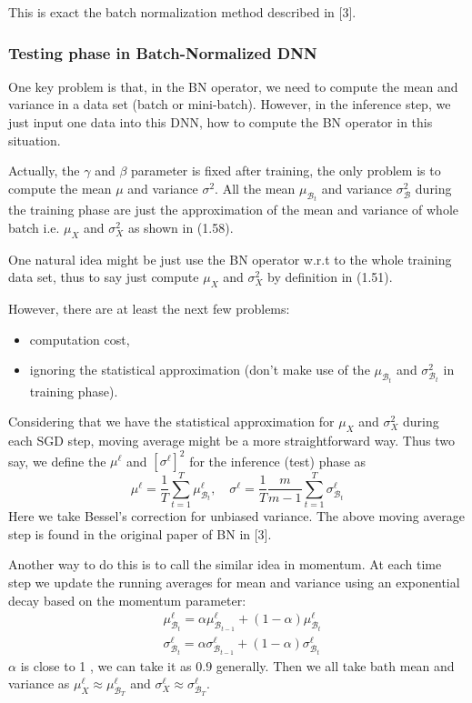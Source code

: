 \documentclass[10pt]{article}
\begin{document}
This is exact the batch normalization method described in [3].

\subsubsection{Testing phase in Batch-Normalized DNN}
One key problem is that, in the BN operator, we need to compute the mean and variance in a data set (batch or mini-batch). However, in the inference step, we just input one data into this DNN, how to compute the BN operator in this situation.

Actually, the $\gamma$ and $\beta$ parameter is fixed after training, the only problem is to compute the mean $\mu$ and variance $\sigma^{2}$. All the mean $\mu_{\mathcal{B}_{t}}$ and variance $\sigma_{\mathcal{B}}^{2}$ during the training phase are just the approximation of the mean and variance of whole batch i.e. $\mu_{X}$ and $\sigma_{X}^{2}$ as shown in (1.58).

One natural idea might be just use the BN operator w.r.t to the whole training data set, thus to say just compute $\mu_{X}$ and $\sigma_{X}^{2}$ by definition in (1.51).

However, there are at least the next few problems:

    \begin{itemize}
      \item computation cost,

      \item ignoring the statistical approximation (don't make use of the $\mu_{\mathcal{B}_{t}}$ and $\sigma_{\mathcal{B}_{t}}^{2}$ in training phase).

    \end{itemize}
Considering that we have the statistical approximation for $\mu_{X}$ and $\sigma_{X}^{2}$ during each SGD step, moving average might be a more straightforward way. Thus two say, we define the $\mu^{\ell}$ and $\left[\sigma^{\ell}\right]^{2}$ for the inference (test) phase as
$$
\mu^{\ell}=\frac{1}{T} \sum_{t=1}^{T} \mu_{\mathcal{B}_{t}}^{\ell}, \quad \sigma^{\ell}=\frac{1}{T} \frac{m}{m-1} \sum_{t=1}^{T} \sigma_{\mathcal{B}_{t}}^{\ell}
$$
Here we take Bessel's correction for unbiased variance. The above moving average step is found in the original paper of BN in [3].

Another way to do this is to call the similar idea in momentum. At each time step we update the running averages for mean and variance using an exponential decay based on the momentum parameter:
$$
\begin{aligned}
&\mu_{\mathcal{B}_{t}}^{\ell}=\alpha \mu_{\mathcal{B}_{t-1}}^{\ell}+(1-\alpha) \mu_{\mathcal{B}_{t}}^{\ell} \\
&\sigma_{\mathcal{B}_{t}}^{\ell}=\alpha \sigma_{\mathcal{B}_{t-1}}^{\ell}+(1-\alpha) \sigma_{\mathcal{B}_{t}}^{\ell}
\end{aligned}
$$
$\alpha$ is close to 1 , we can take it as $0.9$ generally. Then we all take bath mean and variance as $\mu_{X}^{\ell} \approx \mu_{\mathcal{B}_{T}}^{\ell}$ and $\sigma_{X}^{\ell} \approx \sigma_{\mathcal{B}_{T}}^{\ell} .$
\end{document}

